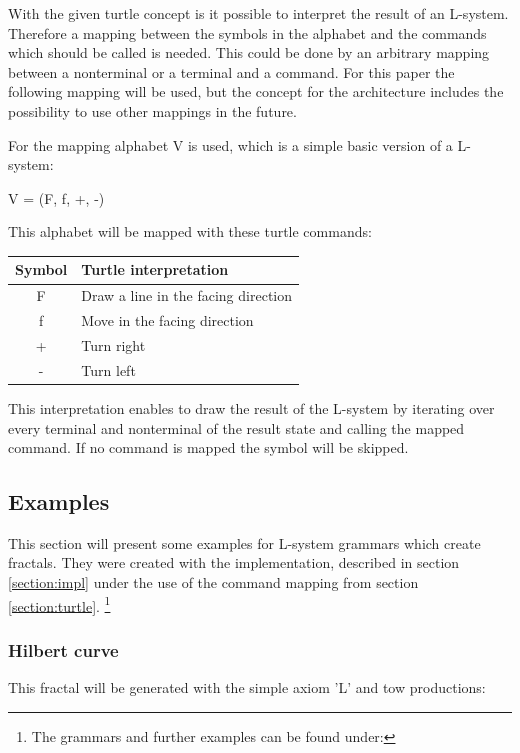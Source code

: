 \documentclass[english]{cpp-hmwk}
\begin{document}
\noindent  With the given turtle concept is it possible to interpret the result of an L-system. Therefore a mapping between the symbols in the alphabet and the commands which should be called is needed.
This could be done by an arbitrary mapping between a nonterminal or a terminal and a command. For this paper the following mapping will be used, but the concept for the architecture includes the possibility to use other mappings in the future.

\noindent For the mapping alphabet V is used, which is a simple basic version of a L-system:

\begin{center}
V = (F, f, +, -)
\end{center}

This alphabet will be mapped with these turtle commands:

\begin{center}
\begin{tabular}{ c l }
Symbol & Turtle interpretation \\
\hline
F & Draw a line in the facing direction  \\ 
f & Move in the facing direction  \\  
+& Turn right  \\  
-& Turn left  \\  

\end{tabular}
\end{center}

This interpretation enables to draw the result of the L-system by iterating over every terminal and nonterminal of the result state and calling the mapped command. If no command is mapped the symbol will be skipped.

\subsection{Examples}
This section will present some examples for L-system grammars which create fractals. They were created with the implementation, described in section \ref{section:impl} under the use of the command mapping from section \ref{section:turtle}. 
\footnote{The grammars and further examples can be found under: }
  
\subsubsection{Hilbert curve}
This fractal will be generated with the simple axiom 'L' and tow productions: 
\end{document}
